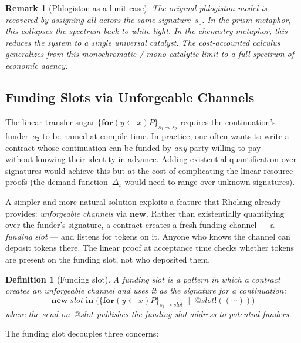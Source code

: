\documentclass[11pt,a4paper]{article}
\makeatletter
\newtheorem{definition}[theorem]{Definition}
\newtheorem{remark}[theorem]{Remark}
\newcommand{\Par}{\mathbin{|}}
\newcommand{\forc}{\mathbf{for}}
\newcommand{\send}[2]{#1 !\!\left( #2 \right)}
\newcommand{\recv}[3]{\forc\!\left( #1 \leftarrow #2 \right) #3}
\newcommand{\quot}[1]{@#1}
\newcommand{\signed}[2]{\{#1\}_{#2}}
\makeatother
\begin{document}
\begin{remark}[Phlogiston as a limit case]
  The original phlogiston model is recovered by assigning all
  actors the same signature~$s_0$.  In the prism metaphor, this
  collapses the spectrum back to white light.  In the chemistry
  metaphor, this reduces the system to a single universal
  catalyst.  The cost-accounted calculus generalizes from this
  monochromatic / mono-catalytic limit to a full spectrum of
  economic agency.
\end{remark}

\subsection{Funding Slots via Unforgeable Channels}
\label{sec:funding-slots}

The linear-transfer sugar
$\signed{\recv{y}{x}{P}}{s_1 \multimap s_2}$ requires the
continuation's funder~$s_2$ to be named at compile time.  In
practice, one often wants to write a contract whose
continuation can be funded by \emph{any} party willing to pay
--- without knowing their identity in advance.  Adding
existential quantification over signatures would achieve this
but at the cost of complicating the linear resource proofs
(the demand function~$\Delta_s$ would need to range over
unknown signatures).

A simpler and more natural solution exploits a feature that
Rholang already provides: \emph{unforgeable channels} via
$\mathbf{new}$.  Rather than existentially quantifying over
the funder's signature, a contract creates a fresh funding
channel --- a \emph{funding slot} --- and listens for tokens
on it.  Anyone who knows the channel can deposit tokens there.
The linear proof at acceptance time checks whether tokens are
present on the funding slot, not who deposited them.

\begin{definition}[Funding slot]
  \label{def:funding-slot}
  A funding slot is a pattern in which a contract creates an
  unforgeable channel and uses it as the signature for a
  continuation:
  \[
    \mathbf{new}\;\mathit{slot}\;\mathbf{in}\;
    \bigl(
      \signed{\recv{y}{x}{P}}
        {s_1 \multimap \mathit{slot}}
      \;\Par\;
      \send{\quot{\mathit{slot}}}{(\cdots)}
    \bigr)
  \]
  where the send on~$\quot{\mathit{slot}}$ publishes the
  funding-slot address to potential funders.
\end{definition}

\noindent
The funding slot decouples three concerns:
\end{document}
